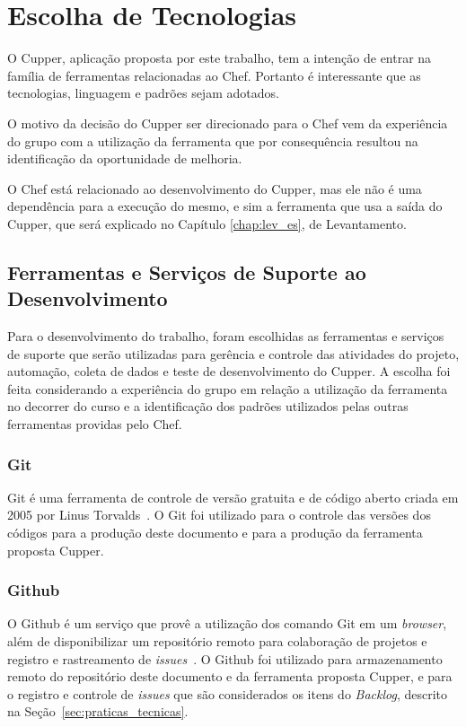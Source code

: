 \section{Escolha de Tecnologias}
\label{sec:tec}

O Cupper, aplicação proposta por este trabalho, tem a intenção de entrar
na família de ferramentas relacionadas ao Chef. Portanto é interessante que
as tecnologias, linguagem e padrões sejam adotados. %

O motivo da decisão do Cupper ser direcionado para o Chef vem da experiência do
grupo com a utilização da ferramenta que por consequência resultou na identificação
da oportunidade de melhoria.

O Chef está relacionado ao desenvolvimento do Cupper, mas ele não é uma
dependência para a execução do mesmo, e sim a ferramenta que usa a saída do Cupper,
que será explicado no Capítulo \ref{chap:lev_es}, de Levantamento.

\subsection{Ferramentas e Serviços de Suporte ao Desenvolvimento}
\label{sec:supdev}

Para o desenvolvimento do trabalho, foram escolhidas as ferramentas e serviços de suporte que serão
utilizadas para gerência e controle das atividades do projeto, automação, coleta de dados e teste
de desenvolvimento do Cupper. A escolha foi feita considerando a experiência do
grupo em relação a utilização da ferramenta no decorrer do curso e a identificação dos
padrões utilizados pelas outras ferramentas providas pelo Chef.

\subsubsection{Git}
\label{sec:supdev:git}

Git é uma ferramenta de controle de versão gratuita e de código aberto criada
em 2005 por Linus Torvalds~\cite{chacon:2014}. O Git foi utilizado para o controle das versões
dos códigos para a produção deste documento e para a produção da ferramenta proposta Cupper.

\subsubsection{Github}
\label{sec:supdev:github}

O Github é um serviço que provê a utilização dos comando Git em um \textit{browser}, além de
disponibilizar um repositório remoto para colaboração de projetos e registro e rastreamento de
\textit{issues}~\cite{github:2016}.  O Github foi utilizado para armazenamento remoto do repositório
deste documento e da ferramenta proposta Cupper, e para o registro e controle de \textit{issues} que são
considerados os itens do \textit{Backlog}, descrito na Seção~\ref{sec:praticas_tecnicas}.

